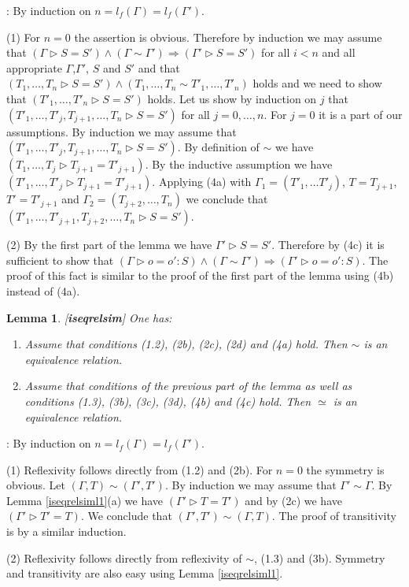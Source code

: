\documentclass[11pt]{article}
\newenvironment{proof}{{\bf Proof}:}{\vskip 5mm }
\newtheorem{lemma}[proposition]{Lemma}
\newcommand{\llabel}[1]{\label{#1}[{\bf #1}]}
\newcommand{\impl}{{\Rightarrow}}
\begin{document}
\begin{proof}
By induction on $n=l_f(\Gamma)=l_f(\Gamma')$.

(1) For $n=0$ the assertion is obvious. Therefore by induction we may assume that $(\Gamma\rhd S=S')\wedge(\Gamma\sim\Gamma')\impl (\Gamma'\rhd S=S')$ for all $i<n$ and all appropriate $\Gamma$,$\Gamma'$, $S$ and $S'$ and that $(T_1,\dots,T_n\rhd S=S')\wedge(T_1,\dots,T_n\sim T'_1,\dots,T'_n)$ holds and we need to show that $(T'_1,\dots,T'_n\rhd S=S')$ holds. Let us show by induction on $j$ that $(T'_1,\dots,T'_j,T_{j+1},\dots,T_n\rhd S=S')$ for all $j=0,\dots,n$. For $j=0$ it is a part of our assumptions. By induction we may assume that $(T'_1,\dots,T'_j,T_{j+1},\dots,T_n\rhd S=S')$. By definition of $\sim$ we have $(T_1,\dots,T_j\rhd T_{j+1}=T'_{j+1})$. By the inductive assumption we have $(T'_1,\dots,T'_j\rhd T_{j+1}=T'_{j+1})$. Applying (4a) with $\Gamma_1=(T'_1,\dots T'_j)$, $T=T_{j+1}$, $T'=T'_{j+1}$ and $\Gamma_2=(T_{j+2},\dots,T_n)$ we conclude that $(T'_1,\dots,T'_{j+1},T_{j+2},\dots,T_n\rhd S=S')$.

(2)  By the first part of the lemma we have $\Gamma'\rhd S=S'$. Therefore by (4c) it is sufficient to show that $(\Gamma\rhd o=o':S)\wedge(\Gamma\sim\Gamma')\impl (\Gamma'\rhd o=o':S)$. The proof of this fact is similar to the proof of the first part of the lemma using (4b) instead of (4a).  
\end{proof}
%
\begin{lemma}
\llabel{iseqrelsim}
One has:
%
\begin{enumerate}
\item Assume that conditions (1.2), (2b), (2c), (2d) and (4a) hold. Then $\sim$ is an equivalence relation.
\item Assume that conditions of the previous part of the lemma as well as conditions (1.3), (3b), (3c), (3d), (4b) and (4c) hold. Then $\simeq$ is an equivalence relation. 
\end{enumerate}
\end{lemma}
%
\begin{proof}
By induction on $n=l_f(\Gamma)=l_f(\Gamma')$. 

(1) Reflexivity follows directly from (1.2) and (2b). For $n=0$ the symmetry is obvious. Let $(\Gamma,T)\sim(\Gamma',T')$. By induction we may assume that $\Gamma'\sim\Gamma$. By Lemma \ref{iseqrelsiml1}(a) we have $(\Gamma'\rhd T=T')$ and by (2c) we have $(\Gamma'\rhd T'=T)$. We conclude that $(\Gamma',T')\sim(\Gamma,T)$.  The proof of transitivity is by a similar induction.

(2) Reflexivity follows directly from  reflexivity of $\sim$, (1.3) and (3b). Symmetry and transitivity are also easy using Lemma \ref{iseqrelsiml1}.
\end{proof}
\end{document}
